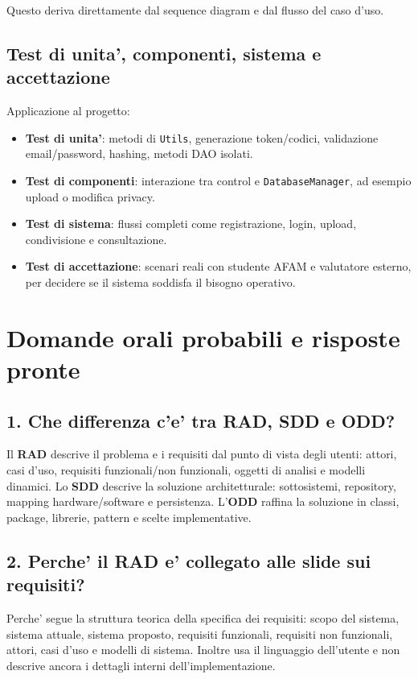 ﻿\documentclass[11pt,a4paper]{article}
\newcommand{\doc}[1]{\textbf{#1}}
\newcommand{\term}[1]{\textbf{#1}}
\begin{document}
Questo deriva direttamente dal sequence diagram e dal flusso del caso d'uso.

\subsection{Test di unita', componenti, sistema e accettazione}

Applicazione al progetto:
\begin{itemize}
  \item \term{Test di unita'}: metodi di \texttt{Utils}, generazione token/codici, validazione
  email/password, hashing, metodi DAO isolati.
  \item \term{Test di componenti}: interazione tra control e \texttt{DatabaseManager}, ad
  esempio upload o modifica privacy.
  \item \term{Test di sistema}: flussi completi come registrazione, login, upload,
  condivisione e consultazione.
  \item \term{Test di accettazione}: scenari reali con studente AFAM e valutatore esterno,
  per decidere se il sistema soddisfa il bisogno operativo.
\end{itemize}

\section{Domande orali probabili e risposte pronte}

\subsection*{1. Che differenza c'e' tra RAD, SDD e ODD?}

Il \doc{RAD} descrive il problema e i requisiti dal punto di vista degli utenti: attori,
casi d'uso, requisiti funzionali/non funzionali, oggetti di analisi e modelli dinamici.
Lo \doc{SDD} descrive la soluzione architetturale: sottosistemi, repository, mapping
hardware/software e persistenza. L'\doc{ODD} raffina la soluzione in classi, package,
librerie, pattern e scelte implementative.

\subsection*{2. Perche' il RAD e' collegato alle slide sui requisiti?}

Perche' segue la struttura teorica della specifica dei requisiti: scopo del sistema, sistema
attuale, sistema proposto, requisiti funzionali, requisiti non funzionali, attori, casi d'uso
e modelli di sistema. Inoltre usa il linguaggio dell'utente e non descrive ancora i dettagli
interni dell'implementazione.
\end{document}
